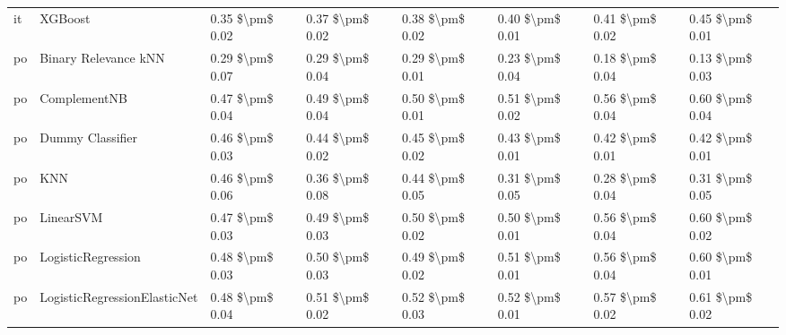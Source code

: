 \begin{tabular}{llllllll}
      it &                         XGBoost & 0.35 \$\textbackslash pm\$ 0.02 &           0.37 \$\textbackslash pm\$ 0.02 &       0.38 \$\textbackslash pm\$ 0.02 &        0.40 \$\textbackslash pm\$ 0.01 &                         0.41 \$\textbackslash pm\$ 0.02 &     0.45 \$\textbackslash pm\$ 0.01 \\
      po &            Binary Relevance kNN & 0.29 \$\textbackslash pm\$ 0.07 &           0.29 \$\textbackslash pm\$ 0.04 &       0.29 \$\textbackslash pm\$ 0.01 &        0.23 \$\textbackslash pm\$ 0.04 &                         0.18 \$\textbackslash pm\$ 0.04 &     0.13 \$\textbackslash pm\$ 0.03 \\
      po &                    ComplementNB & 0.47 \$\textbackslash pm\$ 0.04 &           0.49 \$\textbackslash pm\$ 0.04 &       0.50 \$\textbackslash pm\$ 0.01 &        0.51 \$\textbackslash pm\$ 0.02 &                         0.56 \$\textbackslash pm\$ 0.04 &     0.60 \$\textbackslash pm\$ 0.04 \\
      po &                Dummy Classifier & 0.46 \$\textbackslash pm\$ 0.03 &           0.44 \$\textbackslash pm\$ 0.02 &       0.45 \$\textbackslash pm\$ 0.02 &        0.43 \$\textbackslash pm\$ 0.01 &                         0.42 \$\textbackslash pm\$ 0.01 &     0.42 \$\textbackslash pm\$ 0.01 \\
      po &                             KNN & 0.46 \$\textbackslash pm\$ 0.06 &           0.36 \$\textbackslash pm\$ 0.08 &       0.44 \$\textbackslash pm\$ 0.05 &        0.31 \$\textbackslash pm\$ 0.05 &                         0.28 \$\textbackslash pm\$ 0.04 &     0.31 \$\textbackslash pm\$ 0.05 \\
      po &                       LinearSVM & 0.47 \$\textbackslash pm\$ 0.03 &           0.49 \$\textbackslash pm\$ 0.03 &       0.50 \$\textbackslash pm\$ 0.02 &        0.50 \$\textbackslash pm\$ 0.01 &                         0.56 \$\textbackslash pm\$ 0.04 &     0.60 \$\textbackslash pm\$ 0.02 \\
      po &              LogisticRegression & 0.48 \$\textbackslash pm\$ 0.03 &           0.50 \$\textbackslash pm\$ 0.03 &       0.49 \$\textbackslash pm\$ 0.02 &        0.51 \$\textbackslash pm\$ 0.01 &                         0.56 \$\textbackslash pm\$ 0.04 &     0.60 \$\textbackslash pm\$ 0.01 \\
      po &    LogisticRegressionElasticNet & 0.48 \$\textbackslash pm\$ 0.04 &           0.51 \$\textbackslash pm\$ 0.02 &       0.52 \$\textbackslash pm\$ 0.03 &        0.52 \$\textbackslash pm\$ 0.01 &                         0.57 \$\textbackslash pm\$ 0.02 &     0.61 \$\textbackslash pm\$ 0.02 \\

\end{tabular}
